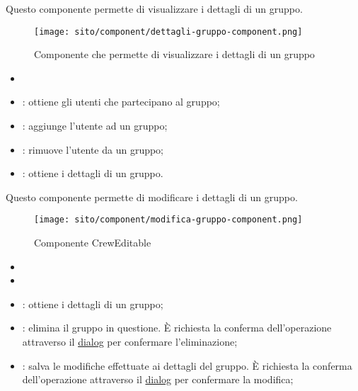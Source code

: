 \label{par:CrewDetail}
Questo componente permette di visualizzare i dettagli di un gruppo.  
\begin{figure}[H] 
    \centering 
    \texttt{[image: sito/component/dettagli-gruppo-component.png]} 
    \caption{Componente che permette di visualizzare i dettagli di un gruppo}
\end{figure}
\begin{itemize}
    \item {}
\end{itemize}


\begin{itemize}
    \item {}: ottiene gli utenti che partecipano al gruppo;
    \item {}: aggiunge l'utente ad un gruppo;
    \item {}: rimuove l'utente da un gruppo;
    \item {}: ottiene i dettagli di un gruppo.
\end{itemize}



\label{par:CrewEditable}

Questo componente permette di modificare i dettagli di un gruppo.  
\begin{figure}[H] 
    \centerline{\texttt{[image: sito/component/modifica-gruppo-component.png]}} 
    \caption{Componente CrewEditable}
\end{figure}
\begin{itemize}
    \item {}
    \item {}
\end{itemize}


\begin{itemize}
    \item {}: ottiene i dettagli di un gruppo;
    \item {}: elimina il gruppo in questione. È richiesta la conferma dell'operazione attraverso il \hyperref[par:Dialog]{dialog} per confermare l'eliminazione; 
    \item {}: salva le modifiche effettuate ai dettagli del gruppo. È richiesta la conferma dell'operazione attraverso il \hyperref[par:Dialog]{dialog} per confermare la modifica; 
\end{itemize}

